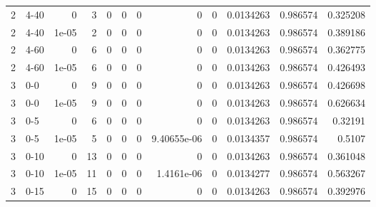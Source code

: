 \begin{tabular}{rlrrrrrrrrrr}
     2 & 4-40   &      0     &           3 &                 0 &                 0 &     0           &     0           &      0           &        0.0134263 &               0.986574 &           0.325208 \\
     2 & 4-40   &      1e-05 &           2 &                 0 &                 0 &     0           &     0           &      0           &        0.0134263 &               0.986574 &           0.389186 \\
     2 & 4-60   &      0     &           6 &                 0 &                 0 &     0           &     0           &      0           &        0.0134263 &               0.986574 &           0.362775 \\
     2 & 4-60   &      1e-05 &           6 &                 0 &                 0 &     0           &     0           &      0           &        0.0134263 &               0.986574 &           0.426493 \\
     3 & 0-0    &      0     &           9 &                 0 &                 0 &     0           &     0           &      0           &        0.0134263 &               0.986574 &           0.426698 \\
     3 & 0-0    &      1e-05 &           9 &                 0 &                 0 &     0           &     0           &      0           &        0.0134263 &               0.986574 &           0.626634 \\
     3 & 0-5    &      0     &           6 &                 0 &                 0 &     0           &     0           &      0           &        0.0134263 &               0.986574 &           0.32191  \\
     3 & 0-5    &      1e-05 &           5 &                 0 &                 0 &     0           &     9.40655e-06 &      0           &        0.0134357 &               0.986574 &           0.5107   \\
     3 & 0-10   &      0     &          13 &                 0 &                 0 &     0           &     0           &      0           &        0.0134263 &               0.986574 &           0.361048 \\
     3 & 0-10   &      1e-05 &          11 &                 0 &                 0 &     0           &     1.4161e-06  &      0           &        0.0134277 &               0.986574 &           0.563267 \\
     3 & 0-15   &      0     &          15 &                 0 &                 0 &     0           &     0           &      0           &        0.0134263 &               0.986574 &           0.392976 \\

\end{tabular}
